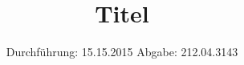 

\subject{V21}
\title{Titel}
\date{
\centering
  Durchführung: 15.15.2015
  \hspace{3em}
  Abgabe: 212.04.3143
}



\maketitle
\thispagestyle{empty}
\tableofcontents
\newpage

%

%




\printbibliography


